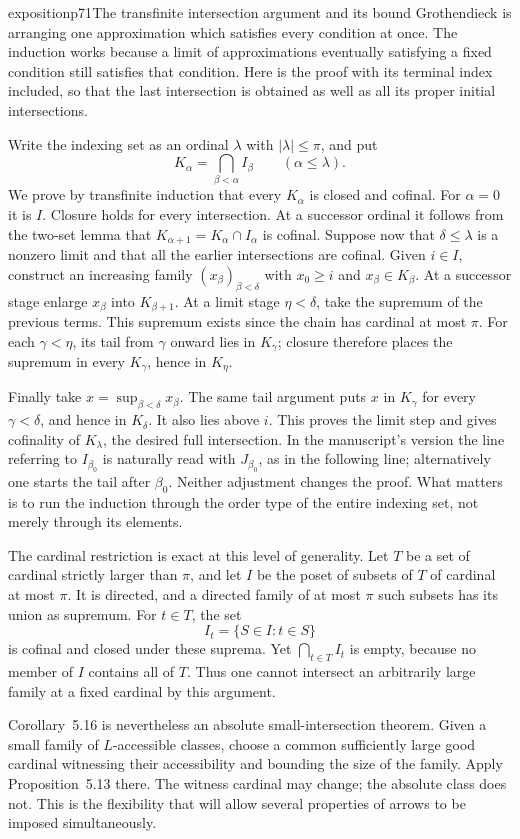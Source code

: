 \begin{dcomment}{exposition}{p71}{The transfinite intersection argument and its bound}
Grothendieck is arranging one approximation which satisfies every condition at once. The induction works because a limit of approximations eventually satisfying a fixed condition still satisfies that condition. Here is the proof with its terminal index included, so that the last intersection is obtained as well as all its proper initial intersections.

Write the indexing set as an ordinal $\lambda$ with $|\lambda|\leq\pi$, and put
\[
 K_\alpha=\bigcap_{\beta<\alpha}I_\beta\qquad(\alpha\leq\lambda).
\]
We prove by transfinite induction that every $K_\alpha$ is closed and cofinal. For $\alpha=0$ it is $I$. Closure holds for every intersection. At a successor ordinal it follows from the two-set lemma that $K_{\alpha+1}=K_\alpha\cap I_\alpha$ is cofinal. Suppose now that $\delta\leq\lambda$ is a nonzero limit and that all the earlier intersections are cofinal. Given $i\in I$, construct an increasing family $(x_\beta)_{\beta<\delta}$ with $x_0\geq i$ and $x_\beta\in K_\beta$. At a successor stage enlarge $x_\beta$ into $K_{\beta+1}$. At a limit stage $\eta<\delta$, take the supremum of the previous terms. This supremum exists since the chain has cardinal at most $\pi$. For each $\gamma<\eta$, its tail from $\gamma$ onward lies in $K_\gamma$; closure therefore places the supremum in every $K_\gamma$, hence in $K_\eta$.

Finally take $x=\sup_{\beta<\delta}x_\beta$. The same tail argument puts $x$ in $K_\gamma$ for every $\gamma<\delta$, and hence in $K_\delta$. It also lies above $i$. This proves the limit step and gives cofinality of $K_\lambda$, the desired full intersection. In the manuscript's version the line referring to $I_{\beta_0}$ is naturally read with $J_{\beta_0}$, as in the following line; alternatively one starts the tail after $\beta_0$. Neither adjustment changes the proof. What matters is to run the induction through the order type of the entire indexing set, not merely through its elements.

The cardinal restriction is exact at this level of generality. Let $T$ be a set of cardinal strictly larger than $\pi$, and let $I$ be the poset of subsets of $T$ of cardinal at most $\pi$. It is directed, and a directed family of at most $\pi$ such subsets has its union as supremum. For $t\in T$, the set
\[
 I_t=\{S\in I:t\in S\}
\]
is cofinal and closed under these suprema. Yet $\bigcap_{t\in T}I_t$ is empty, because no member of $I$ contains all of $T$. Thus one cannot intersect an arbitrarily large family at a fixed cardinal by this argument.

Corollary~5.16 is nevertheless an absolute small-intersection theorem. Given a small family of $L$-accessible classes, choose a common sufficiently large good cardinal witnessing their accessibility and bounding the size of the family. Apply Proposition~5.13 there. The witness cardinal may change; the absolute class does not. This is the flexibility that will allow several properties of arrows to be imposed simultaneously.
\end{dcomment}


